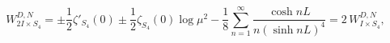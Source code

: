 \begin{equation}
W^{D,N}_{2I\times S_4}=\pm\frac12\zeta'_{S_4}(0)
\pm\frac12\zeta_{S_4}(0)\log\mu^2
-\frac{1}{8}\sum^\infty_{n=1}\frac{\cosh nL}{n(\sinh nL)^4}=2\,W^{D,N}_{I\times S_4},
\end{equation}

